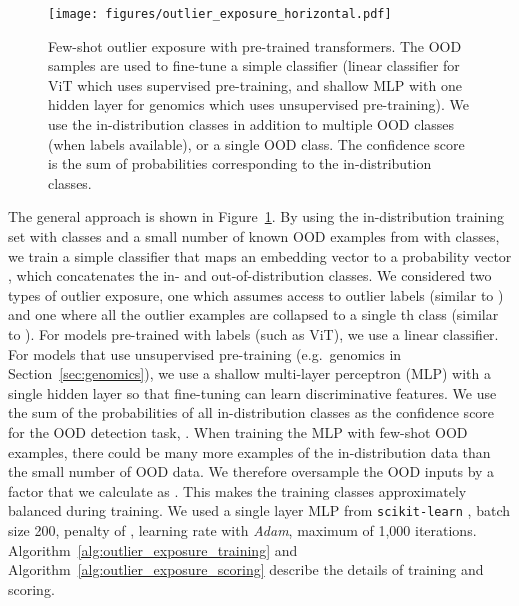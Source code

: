 \documentclass{article}
\begin{document}
\begin{figure}[ht]
    \centering
     \vspace{-0.5em}
    \texttt{[image: figures/outlier\_exposure\_horizontal.pdf]}
    \caption{Few-shot outlier exposure with pre-trained transformers. The OOD samples are used to fine-tune a simple classifier (linear classifier for ViT which uses supervised pre-training, and shallow MLP with one hidden layer for genomics which uses unsupervised pre-training).
    We use the in-distribution classes in addition to multiple OOD classes (when labels available), or a single OOD class. The confidence score is the sum of probabilities corresponding to the in-distribution classes. 
    }
    \vspace{-0.5em}
    \label{fig:few-shot_oe}
\end{figure}

The general approach is shown in Figure~\ref{fig:few-shot_oe}. 
By using the in-distribution training set  with  classes and a small number of known OOD examples from  with  classes, we train a simple classifier  that maps an embedding vector  to a probability vector , which concatenates the in- and out-of-distribution classes. 
We considered two types of outlier exposure, one which assumes access to outlier labels (similar to \citep{roy2021does}) and one where all the outlier examples are collapsed to a single th class (similar to \citep{thulasidasan2021a}). 
For models pre-trained with labels (such as ViT), we use a linear classifier. For models that use unsupervised pre-training (e.g.~genomics in Section~\ref{sec:genomics}), we use a shallow multi-layer perceptron (MLP) with a single hidden layer so that fine-tuning can learn discriminative features. 
We use the sum of the probabilities of all  in-distribution classes as the confidence score for the OOD detection task, 
. 
When training the MLP  with few-shot OOD examples, there could be many more examples of the in-distribution data than the small number of OOD data. We therefore oversample the OOD inputs by a factor that we calculate as . This makes the training classes approximately balanced during training. We used a single layer MLP from \verb|scikit-learn| \citep{scikit-learn}, batch size 200,  penalty of , learning rate  with \textit{Adam}, maximum of 1,000 iterations.  
Algorithm~\ref{alg:outlier_exposure_training} and Algorithm~\ref{alg:outlier_exposure_scoring} describe the details of training and scoring. 
\end{document}
